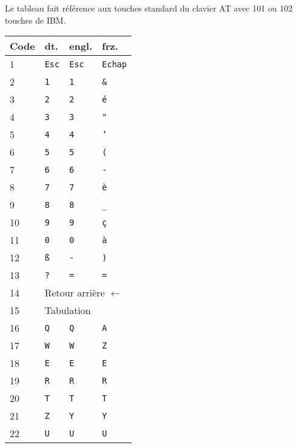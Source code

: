 Le tableau fait référence aux touches standard du clavier AT avec 101 ou 102 touches de IBM.

\newcommand\twoheaduparrow{\mathrel{\rotatebox[origin=c]{90}{$\twoheadrightarrow$}}}
\newcommand\twoheaddownarrow{\mathrel{\rotatebox[origin=c]{270}{$\twoheadrightarrow$}}}

\begin{longtable}{|l|l|l|l|}
  \hline
  \textbf{Code} & \textbf{dt.} & \textbf{engl.} & \textbf{frz.} \\
  \endhead
  \hline
  1 & \texttt{Esc} & \texttt{Esc} & \texttt{Echap} \\ \hline
  2 & \texttt{1}   & \texttt{1}   & \texttt{\&} \\ \hline
  3 & \texttt{2}   & \texttt{2}   & \texttt{é} \\ \hline
  4 & \texttt{3}   & \texttt{3}   & \texttt{"} \\ \hline
  5 & \texttt{4}   & \texttt{4}   & \texttt{'} \\ \hline
  6 & \texttt{5}   & \texttt{5}   & \texttt{(} \\ \hline
  7 & \texttt{6}   & \texttt{6}   & \texttt{-} \\ \hline
  8 & \texttt{7}   & \texttt{7}   & \texttt{è} \\ \hline
  9 & \texttt{8}   & \texttt{8}   & \texttt{\_} \\ \hline
  10 & \texttt{9}   & \texttt{9}   & \texttt{ç} \\ \hline
  11 & \texttt{0}   & \texttt{0}   & \texttt{à} \\ \hline
  12 & \texttt{ß}   & \texttt{-}   & \texttt{)} \\ \hline
  13 & \texttt{?}   & \texttt{=}   & \texttt{=} \\ \hline
  14 & \multicolumn{3}{|l|}{Retour arrière $\longleftarrow$} \\ \hline
  15 & \multicolumn{3}{|l|}{Tabulation} \\ \hline
  16 & \texttt{Q} & \texttt{Q} & \texttt{A} \\ \hline
  17 & \texttt{W} & \texttt{W} & \texttt{Z} \\ \hline
  18 & \texttt{E} & \texttt{E} & \texttt{E} \\ \hline
  19 & \texttt{R} & \texttt{R} & \texttt{R} \\ \hline
  20 & \texttt{T} & \texttt{T} & \texttt{T} \\ \hline
  21 & \texttt{Z} & \texttt{Y} & \texttt{Y} \\ \hline
  22 & \texttt{U} & \texttt{U} & \texttt{U} \\ \hline

\end{longtable}
